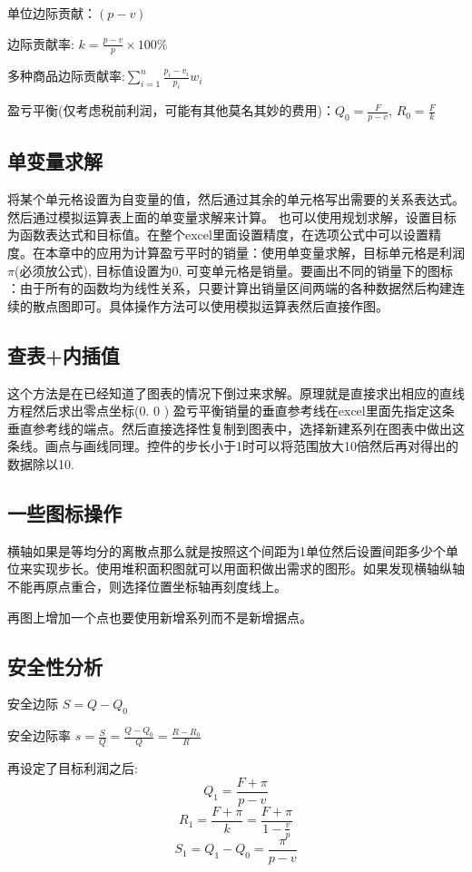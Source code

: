 \documentclass[10pt, a4paper]{article}
\begin{document}
    单位边际贡献：$(p - v)$

    边际贡献率: $k = \frac{p - v}{p} \times 100\%$
    
    多种商品边际贡献率:$\sum_{i = 1}^{n}\frac{p_i - v_i}{p_i}w_i$
    
    盈亏平衡(仅考虑税前利润，可能有其他莫名其妙的费用)：$Q_0 = \frac{F}{p - v}$, $R_0 = \frac{F}{k}$

    \subsection{单变量求解}
        将某个单元格设置为自变量的值，然后通过其余的单元格写出需要的关系表达式。然后通过模拟运算表上面的单变量求解来计算。 也可以使用规划求解，设置目标为函数表达式和目标值。在整个excel里面设置精度，在选项公式中可以设置精度。在本章中的应用为计算盈亏平时的销量：使用单变量求解，目标单元格是利润$\pi$(必须放公式), 目标值设置为0, 可变单元格是销量。要画出不同的销量下的图标 ：由于所有的函数均为线性关系，只要计算出销量区间两端的各种数据然后构建连续的散点图即可。具体操作方法可以使用模拟运算表然后直接作图。
    \subsection{查表+内插值}
        这个方法是在已经知道了图表的情况下倒过来求解。原理就是直接求出相应的直线方程然后求出零点坐标(0. 0  ) 盈亏平衡销量的垂直参考线在excel里面先指定这条垂直参考线的端点。然后直接选择性复制到图表中，选择新建系列在图表中做出这条线。画点与画线同理。控件的步长小于1时可以将范围放大10倍然后再对得出的数据除以10.

    \subsection{一些图标操作}
        横轴如果是等均分的离散点那么就是按照这个间距为1单位然后设置间距多少个单位来实现步长。使用堆积面积图就可以用面积做出需求的图形。如果发现横轴纵轴不能再原点重合，则选择位置坐标轴再刻度线上。

        再图上增加一个点也要使用新增系列而不是新增据点。 
    \subsection{安全性分析}
        安全边际 $S = Q - Q_0$

        安全边际率 $s = \frac{S}{Q} = \frac{Q - Q_0}{Q} = \frac{R - R_0}{R}$

        再设定了目标利润之后:
        $$Q_1 = \frac{F + \pi}{p - v}$$
        $$R_1 = \frac{F + \pi}{k} = \frac{F + \pi}{1 - \frac{v}{p}}$$
        $$S_1 = Q_1 - Q_0 = \frac{\pi}{p - v}$$
\end{document}
